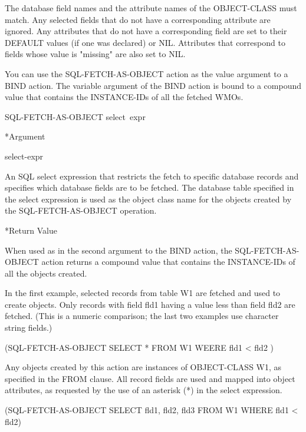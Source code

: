 {{The database field names and the attribute names of the
OBJECT-CLASS must match. Any selected fields that do not have
a corresponding attribute are ignored. Any attributes that do
not have a corresponding field are set to their DEFAULT
values (if one was declared) or NIL. Attributes that
correspond to fields whose value is "missing" are also set to
NIL.

You can use the SQL-FETCH-AS-OBJECT action as the value
argument to a BIND action. The variable argument of the BIND
action is bound to a compound value that contains the
INSTANCE-IDs of all the fetched WMOs.



\Format

SQL-FETCH-AS-OBJECT select~expr



*Argument

select-expr

An SQL select expression that restricts the fetch to specific
database records and specifies which database fields are to
be fetched. The database table specified in the select
expression is used as the object class name for the objects
created by the SQL-FETCH-AS-OBJECT operation.



*Return Value

When used as in the second argument to the BIND action, the
SQL-FETCH-AS-OBJECT action returns a compound value that
contains the INSTANCE-IDs of all the objects created.



\Example

In the first example, selected records from table W1 are
fetched and used to create objects. Only records with field
fld1 having a value less than field fld2 are fetched. (This
is a numeric comparison; the last two examples use character
string fields.)



(SQL-FETCH-AS-OBJECT SELECT * FROM W1 WEERE fld1 < fld2 )



Any objects created by this action are instances of
OBJECT-CLASS W1, as specified in the FROM clause. All record
fields are used and mapped into object attributes, as
requested by the use of an asterisk (*) in the select
expression.



(SQL-FETCH-AS-OBJECT SELECT fld1, fld2, fld3 FROM W1 WHERE
fld1 < fld2)



}}
